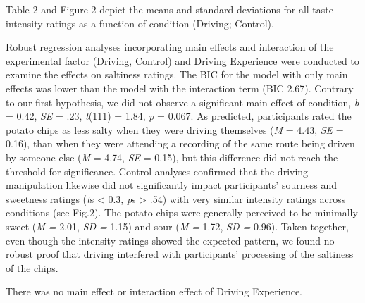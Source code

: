 \documentclass[authordate, empirical, issue]{jote-new-article}
\begin{document}
Table 2 and Figure 2 depict the means and standard deviations for all taste intensity ratings as a function of condition (Driving; Control).








Robust regression analyses incorporating main effects and interaction of the experimental factor (Driving, Control) and Driving Experience were conducted to examine the effects on saltiness ratings. The BIC for the model with only main effects was lower than the model with the interaction term (BIC 2.67). Contrary to our first hypothesis, we did not observe a significant main effect of condition, \emph{b }= 0.42, \emph{SE }= .23, \emph{t}(111) = 1.84, \emph{p }= 0.067. As predicted, participants rated the potato chips as less salty when they were driving themselves (\emph{M }= 4.43, \emph{SE }= 0.16), than when they were attending a recording of the same route being driven by someone else (\emph{M }= 4.74, \emph{SE }= 0.15), but this difference did not reach the threshold for significance. Control analyses confirmed that the driving manipulation likewise did not significantly impact participants’ sourness and sweetness ratings (\emph{t}s < 0.3, \emph{p}s > .54) with very similar intensity ratings across conditions (see Fig.2). The potato chips were generally perceived to be minimally sweet (\emph{M = }2.01, \emph{SD = }1.15) and sour (\emph{M = }1.72, \emph{SD = }0.96). Taken together, even though the intensity ratings showed the expected pattern, we found no robust proof that driving interfered with participants’ processing of the saltiness of the chips.



There was no main effect or interaction effect of Driving Experience.
\end{document}
